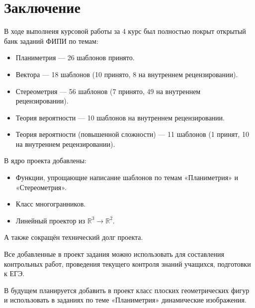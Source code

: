 \section*{Заключение}
В ходе выполнеия курсовой работы за 4 курс был полностью покрыт открытый банк заданий ФИПИ по темам:
		      \begin{itemize}
			      \item Планиметрия — 26 шаблонов принято.
			      \item Вектора — 18 шаблонов (10 принято, 8 на внутреннем рецензировании).
			      \item Стереометрия — 56 шаблонов (7 принято, 49 на внутреннем рецензировании).
			      \item Теория вероятности — 10 шаблонов на внутреннем рецензировании.
			      \item Теория вероятности (повышенной сложности) — 11 шаблонов (1 принят, 10 на внутреннем рецензировании).
		      \end{itemize}

В ядро проекта добавлены: 
\begin{itemize}
    \item Функции, упрощающие написание шаблонов по темам «Планиметрия» и  «Стереометрия».
    \item Класс многогранников.
    \item Линейный проектор из $\mathbb{R}^3 \to \mathbb{R}^2$.
\end{itemize}

А также сокращён технический долг проекта.

Все добавленные в проект задания можно использовать для составления контрольных работ, проведения текущего контроля знаний учащихся, подготовки к ЕГЭ.~\cite{chas-ege}

В будущем планируется добавить в проект класс плоских геометрических фигур и использовать в заданиях по теме «Планиметрия» динамические изображения.


